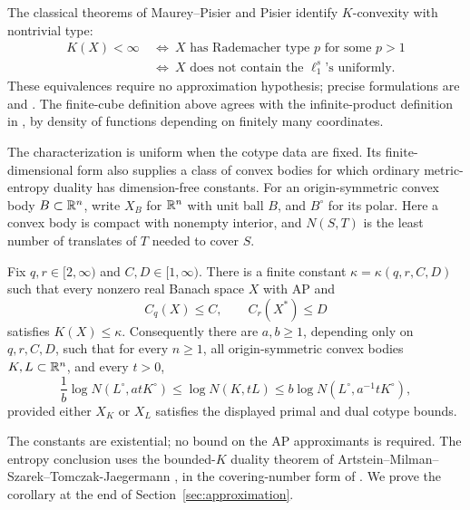 The classical theorems of Maurey--Pisier and Pisier
\cite{MP76,Pis82K} identify \(K\)-convexity with nontrivial type:
\begin{equation}\label{eq:classical-characterization}
\begin{split}
K(X)<\infty
&\ \Longleftrightarrow\
X\text{ has Rademacher type }p\text{ for some }p>1\\
&\ \Longleftrightarrow\
X\text{ does not contain the }\ell_1^s\text{'s uniformly}.
\end{split}
\end{equation}
These equivalences require no approximation hypothesis; precise
formulations are \cite[Theorem~4.40(i)]{Pis11IHP} and
\cite[Theorem~1.5]{Pis80Kseminar}.
The finite-cube definition above agrees with the infinite-product
definition in \cite[Definition~1.1]{Pis80Kseminar}, by density of
functions depending on finitely many coordinates.

The characterization is uniform when the cotype data are fixed. Its
finite-dimensional form also supplies a class of convex bodies for which
ordinary metric-entropy duality has dimension-free constants.
For an origin-symmetric convex body \(B\subset\mathbb R^n\), write \(X_B\)
for \(\mathbb R^n\) with unit ball \(B\), and \(B^\circ\) for its polar.
Here a convex body is compact with nonempty interior, and \(N(S,T)\)
is the least number of translates of \(T\) needed to cover \(S\).

\begin{corollary}
\label{cor:uniform-cotype-entropy}
Fix \(q,r\in[2,\infty)\) and \(C,D\in[1,\infty)\). There is a
finite constant \(\kappa=\kappa(q,r,C,D)\) such that every nonzero
real Banach space \(X\) with AP and
\[
C_q(X)\le C,\qquad C_r(X^*)\le D
\]
satisfies \(K(X)\le\kappa\).
Consequently there are \(a,b\ge1\), depending only on \(q,r,C,D\),
such that for every \(n\ge1\), all origin-symmetric convex bodies
\(K,L\subset\mathbb R^n\), and every \(t>0\),
\begin{equation}\label{eq:cotype-entropy-duality}
\frac1b\log N(L^\circ,atK^\circ)
\le \log N(K,tL)
\le b\log N(L^\circ,a^{-1}tK^\circ),
\end{equation}
provided either \(X_K\) or \(X_L\) satisfies the displayed primal
and dual cotype bounds.
\end{corollary}

The constants are existential; no bound on the AP approximants is
required. The entropy conclusion uses the bounded-\(K\) duality theorem
of Artstein--Milman--Szarek--Tomczak-Jaegermann
\cite[Theorem~5]{AMSTJ2004}, in the covering-number form of
\cite[Theorem~1.1 and Section~2]{Milman2007}.
We prove the corollary at the end of Section~\ref{sec:approximation}.

